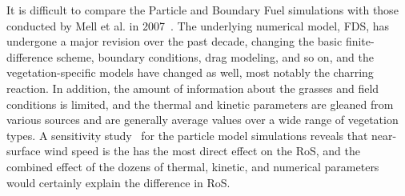 \documentclass[journal,article,atmosphere,submit,moreauthors,pdftex]{Definitions/mdpi}
\begin{document}
It is difficult to compare the Particle and Boundary Fuel simulations with those conducted by Mell et al. in 2007~\cite{Mell:IJWF2007}. The underlying numerical model, FDS, has undergone a major revision over the past decade, changing the basic finite-difference scheme, boundary conditions, drag modeling, and so on, and the vegetation-specific models have changed as well, most notably the charring reaction. In addition, the amount of information about the grasses and field conditions is limited, and the thermal and kinetic parameters are gleaned from various sources and are generally average values over a wide range of vegetation types. A sensitivity study~\cite{McGrattan:CI2017} for the particle model simulations reveals that near-surface wind speed is the has the most direct effect on the RoS, and the combined effect of the dozens of thermal, kinetic, and numerical parameters would certainly explain the difference in RoS. 
\end{document}
